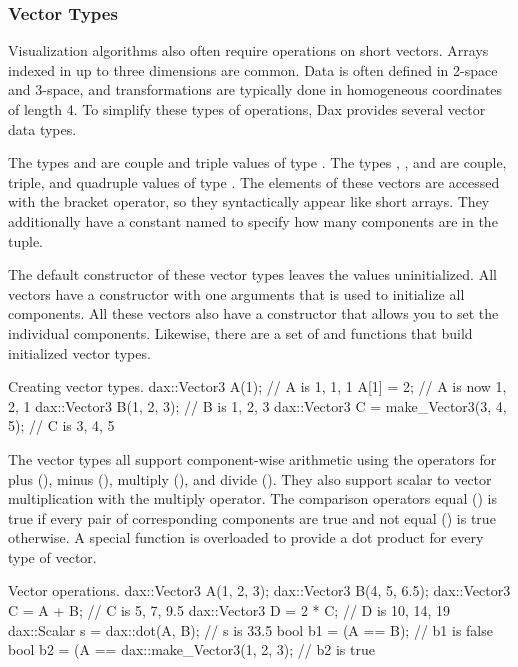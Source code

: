 \subsubsection{Vector Types}

Visualization algorithms also often require operations on short
vectors. Arrays indexed in up to three dimensions are common. Data is often
defined in 2-space and 3-space, and transformations are typically done in
homogeneous coordinates of length 4. To simplify these types of operations,
Dax provides several vector data types.

The types  and  are couple and triple values of type
. The types , , and  are
couple, triple, and quadruple values of type . The elements of
these vectors are accessed with the bracket operator, so they syntactically
appear like short arrays. They additionally have a constant named
 to specify how many
components are in the tuple.

The default constructor of these vector types leaves the values
uninitialized. All vectors have a constructor with one arguments that is
used to initialize all components. All these vectors also have a
constructor that allows you to set the individual components. Likewise,
there are a set of  and  functions that
build initialized vector types.

\begin{daxexample}{Creating vector types.}
dax::Vector3 A(1);                      // A is {1, 1, 1}
A[1] = 2;                               // A is now {1, 2, 1}
dax::Vector3 B(1, 2, 3);                // B is {1, 2, 3}
dax::Vector3 C = make_Vector3(3, 4, 5); // C is {3, 4, 5}
\end{daxexample}

The vector types all support component-wise arithmetic using the operators
for plus (\textcode{+}), minus (\textcode{-}), multiply (\textcode{*}), and
divide (\textcode{/}). They also support scalar to vector multiplication
with the multiply operator. The comparison operators equal (\textcode{==})
is true if every pair of corresponding components are true and not equal
(\textcode{!=}) is true otherwise.  A special  function is
overloaded to provide a dot product for every type of vector.

\begin{daxexample}{Vector operations.}
dax::Vector3 A(1, 2, 3);
dax::Vector3 B(4, 5, 6.5);
dax::Vector3 C = A + B;                     // C is {5, 7, 9.5}
dax::Vector3 D = 2 * C;                     // D is {10, 14, 19}
dax::Scalar s = dax::dot(A, B);             // s is 33.5
bool b1 = (A == B);                         // b1 is false
bool b2 = (A == dax::make_Vector3(1, 2, 3); // b2 is true
\end{daxexample}

